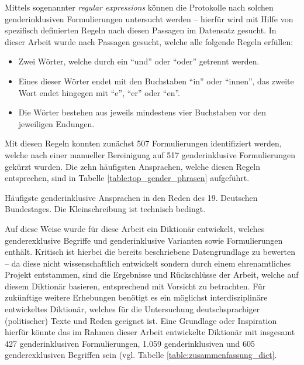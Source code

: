 \documentclass[12pt, 
    twoside=false, 
    bibliography=totoc, 
    numbers=endperiod, 
    headings=normal, 
    toc=chapterentrydotfill
    ]{scrbook}
\begin{document}
Mittels sogenannter \emph{regular expressions} \parencite{thompson_1968} können die Protokolle nach solchen genderinklusiven Formulierungen untersucht werden -- hierfür wird mit Hilfe von spezifisch definierten Regeln nach diesen Passagen im Datensatz gesucht. In dieser Arbeit wurde nach Passagen gesucht, welche alle folgende Regeln erfüllen:
\begin{itemize}
    \setlength\itemsep{1em}
    \item Zwei Wörter, welche durch ein \enquote{und} oder \enquote{oder} getrennt werden.
    \item Eines dieser Wörter endet mit den Buchstaben \enquote{in} oder \enquote{innen}, das zweite Wort endet hingegen mit \enquote{e}, \enquote{er} oder \enquote{en}.
    \item Die Wörter bestehen aus jeweils mindestens vier Buchstaben vor den jeweiligen Endungen.
\end{itemize}

Mit diesen Regeln konnten zunächst 507 Formulierungen identifiziert werden, welche nach einer manueller Bereinigung auf 517 genderinklusive Formulierungen gekürzt wurden. Die zehn häufigsten Ansprachen, welche diesen Regeln entsprechen, sind in Tabelle \ref{table:top_gender_phrasen} aufgeführt. 

\begin{table}[htb]
    \centering
    \caption[Häufigste genderinklusive Ansprachen in den Reden des 19. Deutschen Bundestages]{Häufigste genderinklusive Ansprachen in den Reden des 19. Deutschen Bundestages. Die Kleinschreibung ist technisch bedingt.}
    
    \label{table:top_gender_phrasen}
\end{table}

Auf diese Weise wurde für diese Arbeit ein Diktionär entwickelt, welches genderexklusive Begriffe und genderinklusive Varianten sowie Formulierungen enthält. Kritisch ist hierbei die bereits beschriebene Datengrundlage zu bewerten -- da diese nicht wissenschaftlich entwickelt sondern durch einem ehrenamtliches Projekt entstammen, sind die Ergebnisse und Rückschlüsse der Arbeit, welche auf diesem Diktionär basieren, entsprechend mit Vorsicht zu betrachten.
Für zukünftige weitere Erhebungen benötigt es ein möglichst interdisziplinäre entwickeltes Diktionär, welches für die Untersuchung deutschsprachiger (politischer) Texte und Reden geeignet ist. Eine Grundlage oder Inspiration hierfür könnte das im Rahmen dieser Arbeit entwickelte Diktionär mit insgesamt 427 genderinklusiven Formulierungen, 1.059 genderinklusiven und 605 genderexklusiven Begriffen sein (vgl. Tabelle \ref{table:zusammenfassung_dict}.
\end{document}
